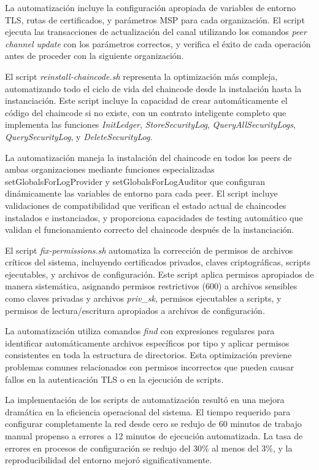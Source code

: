 La automatización incluye la configuración apropiada de variables de entorno TLS, rutas de certificados, y parámetros MSP para cada organización. El script ejecuta las transacciones de actualización del canal utilizando los comandos \textit{peer channel update} con los parámetros correctos, y verifica el éxito de cada operación antes de proceder con la siguiente organización.


El script \textit{reinstall-chaincode.sh} representa la optimización más compleja, automatizando todo el ciclo de vida del chaincode desde la instalación hasta la instanciación. Este script incluye la capacidad de crear automáticamente el código del chaincode si no existe, con un contrato inteligente completo que implementa las funciones \textit{InitLedger}, \textit{StoreSecurityLog}, \textit{QueryAllSecurityLogs}, \textit{QuerySecurityLog}, y \textit{DeleteSecurityLog}.

La automatización maneja la instalación del chaincode en todos los peers de ambas organizaciones mediante funciones especializadas setGlobalsForLogProvider y setGlobalsForLogAuditor que configuran dinámicamente las variables de entorno para cada peer. El script incluye validaciones de compatibilidad que verifican el estado actual de chaincodes instalados e instanciados, y proporciona capacidades de testing automático que validan el funcionamiento correcto del chaincode después de la instanciación.


El script \textit{fix-permissions.sh} automatiza la corrección de permisos de archivos críticos del sistema, incluyendo certificados privados, claves criptográficas, scripts ejecutables, y archivos de configuración. Este script aplica permisos apropiados de manera sistemática, asignando permisos restrictivos (600) a archivos sensibles como claves privadas y archivos \textit{priv\_sk}, permisos ejecutables a scripts, y permisos de lectura/escritura apropiados a archivos de configuración.

La automatización utiliza comandos \textit{find} con expresiones regulares para identificar automáticamente archivos específicos por tipo y aplicar permisos consistentes en toda la estructura de directorios. Esta optimización previene problemas comunes relacionados con permisos incorrectos que pueden causar fallos en la autenticación TLS o en la ejecución de scripts.


La implementación de los scripts de automatización resultó en una mejora dramática en la eficiencia operacional del sistema. El tiempo requerido para configurar completamente la red desde cero se redujo de 60 minutos de trabajo manual propenso a errores a 12 minutos de ejecución automatizada. La tasa de errores en procesos de configuración se redujo del 30\% al menos del 3\%, y la reproducibilidad del entorno mejoró significativamente.

